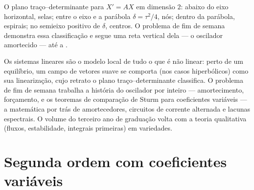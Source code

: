 \begin{omfigure}

{\small O plano traço--determinante para $X' = AX$ em dimensão
$2$: abaixo do eixo horizontal, selas; entre o eixo e
a parábola $\delta = \tau^2/4$, nós; dentro da parábola,
espirais; no semieixo positivo de $\delta$, centros. O problema
de fim de semana demonstra essa classificação e segue uma reta
vertical dela --- o oscilador amortecido --- até a .}
\end{omfigure}

\begin{remark}
Os sistemas lineares são o modelo local de tudo o que é não linear:
perto de um equilíbrio, um campo de vetores suave se comporta (nos
casos hiperbólicos) como sua linearização, cujo retrato o
plano traço--determinante classifica. O problema de fim de semana trabalha
a história do oscilador por inteiro --- amortecimento, forçamento,
 e os teoremas de comparação de Sturm para coeficientes
variáveis --- a matemática por trás de amortecedores, circuitos
de corrente alternada e lacunas espectrais. O volume do terceiro ano de graduação volta
com a teoria qualitativa (fluxos, estabilidade, integrais
primeiras) em variedades.
\end{remark}

\section{Segunda ordem com coeficientes variáveis}

